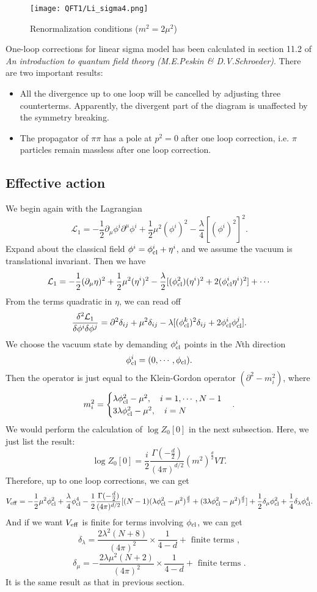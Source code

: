 \begin{figure}[!h]
\centering
\texttt{[image: QFT1/Li\_sigma4.png]}
\caption{Renormalization conditions ($m^2 = 2\mu^2$)}
\end{figure}
One-loop corrections for linear sigma model has been calculated in section 11.2 of \emph{An introduction to quantum field theory (M.E.Peskin \& D.V.Schroeder)}. There are two important results:
\begin{itemize}
\item All the divergence up to one loop will be cancelled by adjusting three counterterms. Apparently, the divergent part of the diagram is unaffected by the symmetry breaking.
\item The propagator of $\pi\pi$ has a pole at $p^2 = 0$ after one loop correction, i.e. $\pi$ particles remain massless after one loop correction.
\end{itemize}

\subsection{Effective action}
We begin again with the Lagrangian
\[\mathcal{L}_1 = -\frac{1}{2} \partial_{\mu} \phi^i \partial^{\mu}\phi^i + \frac{1}{2} \mu^2 (\phi^i)^2 - \frac{\lambda}{4} [(\phi^i)^2]^2.\]
Expand about the classical field $\phi^i = \phi_{\rm cl}^i + \eta^i$, and we assume the vacuum is translational invariant. Then we have
\[\mathcal{L}_1 = -\frac{1}{2}(\partial_{\mu}\eta)^2 + \frac{1}{2}\mu^2(\eta^i)^2 - \frac{\lambda}{2}[(\phi_{\rm cl}^2)(\eta^i)^2+ 2(\phi_{\rm cl}^i\eta^i)^2] + \cdots\]
From the terms quadratic in $\eta$, we can read off
\[\frac{\delta^2 \mathcal{L}_1}{\delta\phi^i\delta\phi^j} = \partial^2\delta_{ij} + \mu^2\delta_{ij} - \lambda[(\phi_{\rm cl}^k)^2\delta_{ij} + 2\phi_{\rm cl}^i \phi_{\rm cl}^j].\]
We choose the vacuum state by demanding $\phi_{\rm cl}^i$ points in the $N$th direction
\[\phi_{\rm cl}^i = (0,\cdots,\phi_{\rm cl}).\]
Then the operator is just equal to the Klein-Gordon operator $(\partial^2-m_i^2)$, where
\[m_i^2 = \begin{cases} \lambda\phi_{\rm cl}^2-\mu^2 , \quad i=1,\cdots,N-1 \\ 3\lambda\phi_{\rm cl}^2-\mu^2 , \quad i=N \end{cases}.\]
We would perform the calculation of $\log Z_0[0]$ in the next subsection. Here, we just list the result:
\[\log Z_0[0] = \frac{i}{2}\frac{\Gamma(-\frac{d}{2})}{(4\pi)^{d/2}}(m^2)^{\frac{d}{2}}VT.\]
Therefore, up to one loop corrections, we can get
\[V_{\rm eff} = -\frac{1}{2} \mu^2 \phi_{\rm cl}^2 + \frac{\lambda}{4} \phi_{\rm cl}^4 - \frac{1}{2}\frac{\Gamma(-\frac{d}{2})}{(4\pi)^{d/2}}[(N-1)(\lambda\phi_{\rm cl}^2-\mu^2)^{\frac{d}{2}} + (3\lambda\phi_{\rm cl}^2-\mu^2)^{\frac{d}{2}}] + \frac{1}{2}\delta_{\mu}\phi_{\rm cl}^2 + \frac{1}{4}\delta_{\lambda}\phi_{\rm cl}^4.\]
And if we want $V_{\rm eff}$ is finite for terms involving $\phi_{\rm cl}$, we can get
\[\delta_{\lambda} = \frac{2\lambda^2(N+8)}{(4\pi)^2} \times \frac{1}{4-d} + \mbox{ finite terms },\]
\[\delta_{\mu} = -\frac{2\lambda\mu^2(N+2)}{(4\pi)^2} \times \frac{1}{4-d} + \mbox{ finite terms }.\]
It is the same result as that in previous section.

